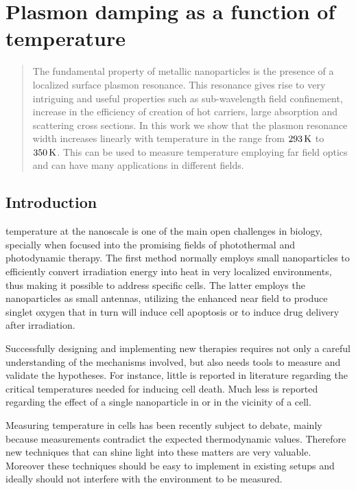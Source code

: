 \chapter{Plasmon damping as a function of temperature}
\label{ch:Damping}

\begin{abstract}
The fundamental property of metallic nanoparticles is the presence of a
localized surface plasmon resonance. This resonance gives rise to very
intriguing and useful properties such as sub-wavelength field confinement,
increase in the efficiency of creation of hot carriers, large absorption and
scattering cross sections. In this work we show that the plasmon resonance width
increases linearly with temperature in the range from $293\,\textrm{K}$ to $350\,\textrm{K}$. This
can be used to measure temperature employing far field optics and can have many
applications in different fields.
\end{abstract}

\newpage


\section{Introduction}
 temperature at the nanoscale is one of the main open
challenges in biology\cite{Yang2011a}, specially when focused into the promising fields of
photothermal\cite{Huang2006a,Hirsch2003} and photodynamic
therapy\cite{West2003}. The first method normally employs small nanoparticles to
efficiently convert irradiation energy into heat in very localized
environments\cite{Ma2014a}, thus making it possible to address specific
cells\cite{Hirsch2003,Huang2008}. The latter employs the nanoparticles as small
antennas, utilizing the enhanced near field to produce singlet oxygen that in
turn will induce cell apoptosis\cite{Hone2002} or to induce drug
delivery after irradiation\cite{Cheng2008}.

Successfully designing and implementing new therapies requires not only a
careful understanding of the mechanisms involved, but also needs tools to
measure and validate the hypotheses. For instance, little is reported in
literature regarding the critical temperatures needed for inducing cell
death\cite{Huang2006a}. Much less is reported regarding the effect of a single
nanoparticle in or in the vicinity of a cell.

Measuring temperature in cells has been recently subject to debate, mainly
because measurements contradict the expected thermodynamic
values\cite{Tanimoto2016,Donner2013,Yang2011a}. Therefore new
techniques that can shine light into these matters are very valuable. Moreover
these techniques should be easy to implement in existing setups and ideally
should not interfere with the environment to be measured.

